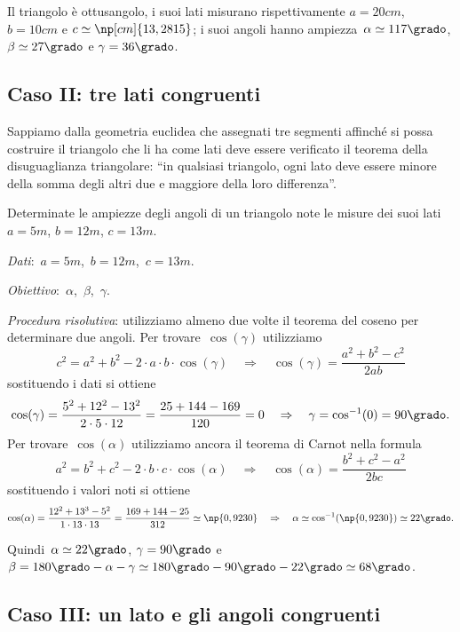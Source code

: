 Il triangolo è ottusangolo, i suoi lati misurano rispettivamente
$a=20\unit{cm}$, $b=10\unit{cm}$ e $c\simeq \np[cm]{13,2815}$; i suoi angoli hanno ampiezza~$\alpha\simeq 117\grado$, $\beta\simeq 27\grado$ e $\gamma=36\grado$.

\subsection{Caso II: tre lati congruenti}

Sappiamo dalla geometria euclidea che assegnati tre segmenti affinché si possa costruire il triangolo che li ha come lati
deve essere verificato il teorema della disuguaglianza triangolare: ``in qualsiasi triangolo, ogni lato deve essere minore della somma
degli altri due e maggiore della loro differenza''.

\begin{problema}
Determinate le ampiezze degli angoli di un triangolo note le misure dei suoi lati~$a=5\unit{m}$, $b=12\unit{m}$, $c=13\unit{m}$.
\end{problema}

\emph{Dati}:~$a= 5\unit{m}$,\quad~$b=12\unit{m}$,\quad~$c=13\unit{m}$.

\emph{Obiettivo}:~$\alpha$,\quad~$\beta$,\quad~$\gamma$.

\emph{Procedura risolutiva}:
utilizziamo almeno due volte il teorema del coseno per determinare due angoli. Per trovare~$\cos(\gamma)$ utilizziamo
\[c^{2}=a^{2}+b^{2}-2\cdot a\cdot b\cdot \cos(\gamma) \quad\Rightarrow\quad \cos(\gamma) = \dfrac{a^{2}+b^{2}-c^{2}}{2ab}\]
sostituendo i dati si ottiene
\[\cos(\gamma)=\dfrac{5^2+12^2-13^2}{2\cdot 5 \cdot 12}=\dfrac{25+144-169}{120}=0 \quad\Rightarrow\quad \gamma=\cos^{-1}(0)=90\grado.\]
Per trovare~$\cos(\alpha)$ utilizziamo ancora il teorema di Carnot nella formula
\[a^{2}=b^{2}+c^{2}-2\cdot b\cdot c\cdot \cos(\alpha) \quad\Rightarrow\quad \cos(\alpha) = \dfrac{b^{2}+c^{2}-a^{2}}{2bc}\]
sostituendo i valori noti si ottiene
\[\cos(\alpha)=\dfrac{12^2+13^3-5^2}{1\cdot 13\cdot 13}=\frac{169+144-25}{312}\simeq \np{0,9230}\quad\Rightarrow\quad \alpha\simeq\cos^{-1}(\np{0,9230})\simeq 22\grado.\]

Quindi~$\alpha\simeq 22\grado$, $\gamma=90\grado$ e $\beta=180\grado-\alpha-\gamma\simeq 180\grado-90\grado-22\grado\simeq 68\grado$.

\subsection{Caso III: un lato e gli angoli congruenti}

